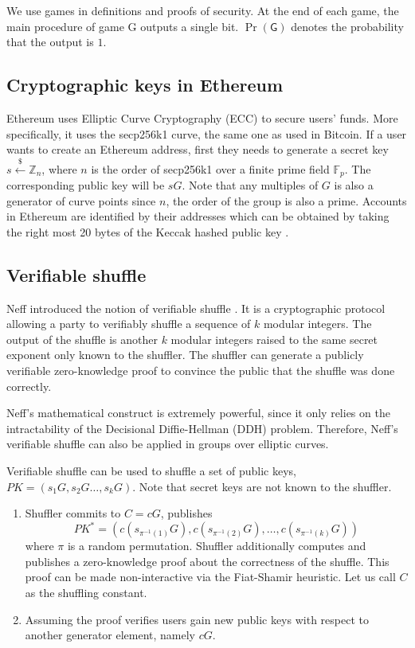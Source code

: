 \documentclass[a4paper]{article}
\theoremstyle{definition}
\begin{document}
We use games in definitions and proofs of security. At the end of each game, the main procedure of game \textsf{G} outputs a single bit. $\Pr(\textsf{G})$ denotes the probability that the output is $1$.
\subsection{Cryptographic keys in Ethereum}
Ethereum uses Elliptic Curve Cryptography (ECC) to secure users' funds. More specifically, it uses the secp256k1 curve, the same one as used in Bitcoin. If a user wants to create an Ethereum address, first they needs to generate a secret key  $s\stackrel{\$}{\leftarrow}\mathbb{Z}_n$, where $n$ is the order of secp256k1 over a finite prime field $\mathbb{F}_{p}$. The corresponding public key will be $sG$. Note that any multiples of $G$ is also a generator of curve points since $n$, the order of the group is also a prime. Accounts in Ethereum are identified by their addresses which can be obtained by taking the right most 20 bytes of the Keccak hashed public key \cite{wood2014ethereum}. 
    
\subsection{Verifiable shuffle}

Neff introduced the notion of verifiable shuffle \cite{neff2001verifiable}. It is a cryptographic protocol allowing a party to verifiably shuffle a sequence of $k$ modular integers. The output of the shuffle is another $k$ modular integers raised to the same secret exponent only known to the shuffler. The shuffler can generate a publicly verifiable zero-knowledge proof to convince the public that the shuffle was done correctly. 

Neff's mathematical construct is extremely powerful, since it only relies on the intractability of the Decisional Diffie-Hellman (DDH) problem. Therefore, Neff's verifiable shuffle can also be applied in groups over elliptic curves.

Verifiable shuffle can be used to shuffle a set of public keys, $PK=(s_{1}G,s_{2}G\dots,s_{k}G)$. Note that secret keys are not known to the shuffler.

\begin{enumerate}
	\item Shuffler commits to $C=cG$, publishes $$PK^*=(c(s_{\pi^{-1}(1)}G),c(s_{\pi^{-1}(2)}G),\dots,c({s_{\pi^{-1}(k)}}G))$$ where $\pi$ is a random permutation. Shuffler additionally computes and publishes a zero-knowledge proof about the correctness of the shuffle. This proof can be made non-interactive via the Fiat-Shamir heuristic. Let us call $C$ as the shuffling constant.
	\item Assuming the proof verifies users gain new public keys with respect to another generator element, namely $cG$.
\end{enumerate}
\end{document}
